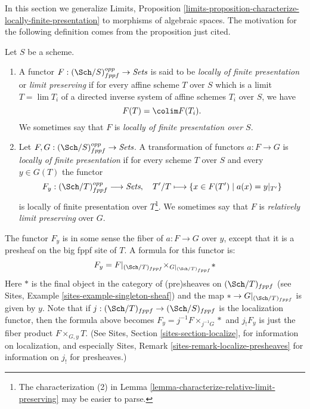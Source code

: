 \noindent
In this section we generalize
Limits, Proposition
\ref{limits-proposition-characterize-locally-finite-presentation}
to morphisms of algebraic spaces.
The motivation for the following definition comes from
the proposition just cited.

\begin{definition}
\label{definition-locally-finite-presentation}
Let $S$ be a scheme.
\begin{enumerate}
\item A functor $F : (\Sch/S)_{fppf}^{opp} \to \textit{Sets}$
is said to be {\it locally of finite presentation} or {\it limit preserving} if
for every affine scheme $T$ over $S$ which is a limit $T = \lim T_i$
of a directed inverse system of affine schemes $T_i$ over $S$, we have
$$
F(T) = \colim F(T_i).
$$
We sometimes say that $F$ is {\it locally of finite presentation over $S$}.
\item Let $F, G : (\Sch/S)_{fppf}^{opp} \to \textit{Sets}$.
A transformation of functors $a : F \to G$
is {\it locally of finite presentation} if for every scheme $T$ over $S$
and every $y \in G(T)$ the functor
$$
F_y : (\Sch/T)_{fppf}^{opp} \longrightarrow \textit{Sets}, \quad
T'/T \longmapsto \{x \in F(T') \mid a(x) = y|_{T'}\}
$$
is locally of finite presentation over $T$\footnote{The characterization (2) in
Lemma \ref{lemma-characterize-relative-limit-preserving}
may be easier to parse.}. We sometimes say that
$F$ is {\it relatively limit preserving} over $G$.
\end{enumerate}
\end{definition}

\noindent
The functor $F_y$ is in some sense the fiber of
$a : F \to G$ over $y$, except that it is a presheaf on the big fppf
site of $T$. A formula for this functor is:
\begin{equation}
\label{equation-fibre-map-functors}
F_y =
F|_{(\Sch/T)_{fppf}}
{\times}_{G|_{(\Sch/T)_{fppf}}}
*
\end{equation}
Here $*$ is the final object in the category of (pre)sheaves
on $(\Sch/T)_{fppf}$ (see
Sites, Example \ref{sites-example-singleton-sheaf})
and the map $* \to G|_{(\Sch/T)_{fppf}}$ is given by $y$.
Note that if $j : (\Sch/T)_{fppf} \to (\Sch/S)_{fppf}$
is the localization functor, then the formula above becomes
$F_y = j^{-1}F \times_{j^{-1}G} *$ and $j_!F_y$ is just the fiber product
$F \times_{G, y} T$. (See
Sites, Section \ref{sites-section-localize},
for information on localization, and especially
Sites, Remark \ref{sites-remark-localize-presheaves}
for information on $j_!$ for presheaves.)

